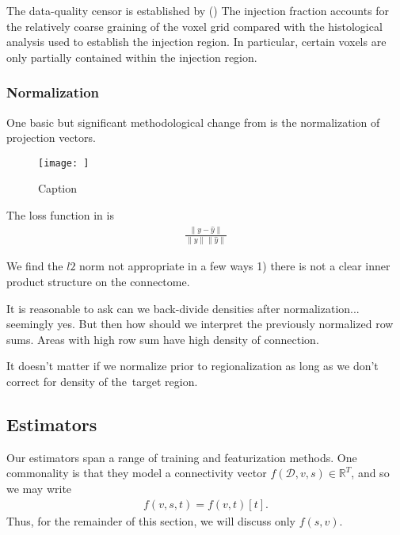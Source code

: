 \documentclass{article}
\newcommand{\skcomment}[1]{({\color{blue}{SK's comment:}}\textbf{\color{blue}{#1}})}
\newcommand{\skcomment}[1]{({\color{blue}{SK's comment:}}\textbf{\color{blue}{#1}})}
\begin{document}
The data-quality censor is established by \skcomment{fill}
The injection fraction accounts for the relatively coarse graining of the voxel grid compared with the histological analysis used to establish the injection region.  In particular, certain voxels are only partially contained within the injection region.

\subsubsection{Normalization}

One basic but significant methodological change from \citet{Knox2019-ot} is the normalization of projection vectors.

\begin{figure}
    \centering
    \texttt{[image: ]}
    \caption{Caption}
    \label{fig:my_label}
\end{figure}

The loss function in \citet{Knox2019-ot} is
\begin{eqnarray*}
\frac{\|y - \hat y\|} {\|y\|\|\hat y\|}
\end{eqnarray*}

We find the $l2$ norm not appropriate in a few ways 1) there is not a clear inner product structure on the connectome.

It is reasonable to ask can we back-divide densities after normalization... seemingly yes.  But then how should we interpret the previously normalized row sums.  Areas with high row sum have high density of connection.  

It doesn't matter if we normalize prior to regionalization as long as we don't correct for density of the target region.


\subsection{Estimators}

Our estimators span a range of training and featurization methods.
One commonality is that they model a connectivity vector $f (\mathcal D, v,s)  \in \mathbb R^T$, and so we may write
\begin{eqnarray*}
f (v,s,t) = f (v,t)[t].
\end{eqnarray*}
Thus, for the remainder of this section, we will discuss only $f (s,v)$.
\end{document}
